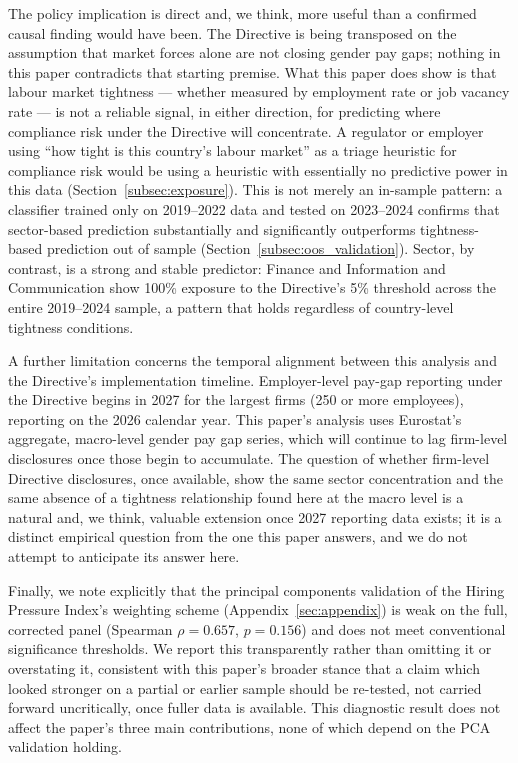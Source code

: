 \documentclass[12pt,a4paper]{article}
\begin{document}
The policy implication is direct and, we think, more useful than a confirmed
causal finding would have been.  The Directive is being transposed on the
assumption that market forces alone are not closing gender pay gaps; nothing in
this paper contradicts that starting premise.  What this paper does show is that
labour market tightness --- whether measured by employment rate or job vacancy
rate --- is not a reliable signal, in either direction, for predicting where
compliance risk under the Directive will concentrate.  A regulator or employer
using ``how tight is this country's labour market'' as a triage heuristic for
compliance risk would be using a heuristic with essentially no predictive power
in this data (Section~\ref{subsec:exposure}).  This is not merely an in-sample
pattern: a classifier trained only on 2019--2022 data and tested on 2023--2024
confirms that sector-based prediction substantially and significantly
outperforms tightness-based prediction out of sample
(Section~\ref{subsec:oos_validation}).  Sector, by contrast, is a strong
and stable predictor: Finance and Information and Communication show 100\%
exposure to the Directive's 5\% threshold across the entire 2019--2024 sample, a
pattern that holds regardless of country-level tightness conditions.

A further limitation concerns the temporal alignment between this analysis and
the Directive's implementation timeline.  Employer-level pay-gap reporting under
the Directive begins in 2027 for the largest firms (250 or more employees),
reporting on the 2026 calendar year.  This paper's analysis uses Eurostat's
aggregate, macro-level gender pay gap series, which will continue to lag
firm-level disclosures once those begin to accumulate.  The question of whether
firm-level Directive disclosures, once available, show the same sector
concentration and the same absence of a tightness relationship found here at the
macro level is a natural and, we think, valuable extension once 2027 reporting
data exists; it is a distinct empirical question from the one this paper answers,
and we do not attempt to anticipate its answer here.

Finally, we note explicitly that the principal components validation of the
Hiring Pressure Index's weighting scheme (Appendix~\ref{sec:appendix}) is weak
on the full, corrected panel (Spearman $\rho=0.657$, $p=0.156$) and does not
meet conventional significance thresholds.  We report this transparently rather
than omitting it or overstating it, consistent with this paper's broader stance
that a claim which looked stronger on a partial or earlier sample should be
re-tested, not carried forward uncritically, once fuller data is available.  This
diagnostic result does not affect the paper's three main contributions, none of
which depend on the PCA validation holding.
\end{document}
